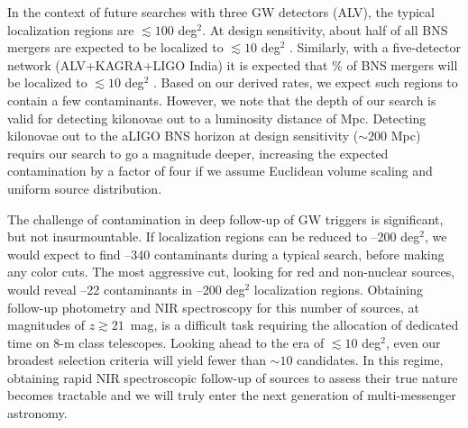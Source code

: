 In the context of future searches with three GW detectors (ALV), the typical localization regions are $\lesssim 100$ deg$^2$. At design sensitivity, about half of all BNS mergers are expected to be localized to $\lesssim10$ deg$^2$ \citep{ChenHolz16}. Similarly, with a five-detector network (ALV+KAGRA+LIGO India) it is expected that \% of BNS mergers will be localized to $\lesssim 10$ deg$^2$ \citep{ChenHolz16}. Based on our derived rates, we expect such regions to contain a few contaminants. However, we note that the depth of our search is valid for detecting kilonovae out to a luminosity distance of  Mpc. Detecting kilonovae out to the aLIGO BNS horizon at design sensitivity ($\sim200$ Mpc) requirs our search to go a magnitude deeper, increasing the expected contamination by a factor of four if we assume Euclidean volume scaling and uniform source distribution.

The challenge of contamination in deep follow-up of GW triggers is significant, but not insurmountable. If localization regions can be reduced to --200 deg$^2$, we would expect to find --340 contaminants during a typical search, before making any color cuts. The most aggressive cut, looking for red and non-nuclear sources, would reveal --22 contaminants in --200 deg$^2$ localization regions. Obtaining follow-up photometry and NIR spectroscopy for this number of sources, at magnitudes of $z \gtrsim 21$~mag, is a difficult task requiring the allocation of dedicated time on 8-m class telescopes. Looking ahead to the era of $\lesssim 10$ deg$^2$, even our broadest selection criteria will yield fewer than $\sim 10$ candidates. In this regime, obtaining rapid NIR spectroscopic follow-up of sources to assess their true nature becomes tractable and we will truly enter the next generation of multi-messenger astronomy.

